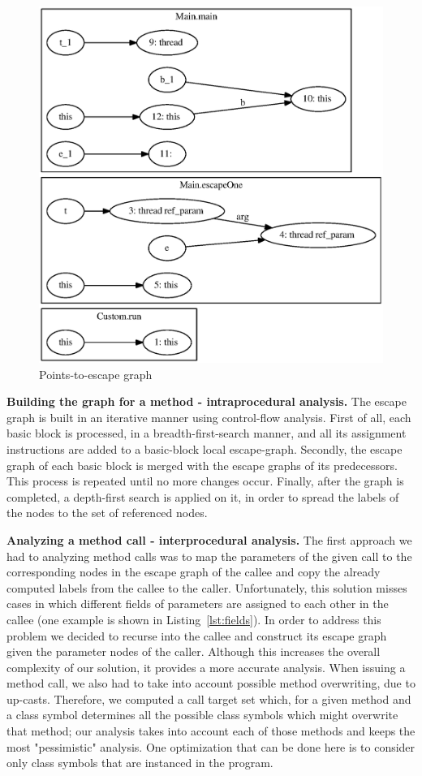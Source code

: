 \documentclass[letterpaper]{article}
\newcommand{\mypar}[1]{{\bf #1.}}
\begin{document}
\begin{figure} \center
 \includegraphics[width=0.8\linewidth]{EscapeTest.eps}
  \caption{Points-to-escape graph}
  \label{fig:escapegraph}
\end{figure}

\mypar{Building the graph for a method - intraprocedural analysis} The escape graph is built in an iterative manner using control-flow analysis.
First of all, each basic block is processed, in a breadth-first-search manner, and all its assignment instructions are added to a
basic-block local escape-graph.
Secondly, the escape graph of each basic block is merged with the escape graphs of its predecessors. This process
is repeated until no more changes occur. Finally, after the graph is completed, a depth-first search is applied on it,
in order to spread the labels of the nodes to the set of referenced nodes.

\mypar{Analyzing a method call - interprocedural analysis} The first approach we had to analyzing method calls was to map the parameters of the given
call to the corresponding nodes in the escape graph of the callee and copy the already computed labels from the callee to the
caller. Unfortunately, this solution misses cases in which different fields of parameters are assigned to each other in the callee
(one example is shown in Listing~\ref{lst:fields}). In order to address this problem we decided to recurse into the callee and
construct its escape graph given the parameter nodes of the caller. Although this increases the overall complexity of our solution,
it provides a more accurate analysis. When issuing a method call, we also had to take into account possible method overwriting, due to up-casts. Therefore, we computed a call target set which, for a given method and a class symbol
determines all the possible class symbols which might overwrite that method; our analysis takes into account
each of those methods and keeps the most "pessimistic" analysis. One optimization that can be done here is to
consider only class symbols that are instanced in the program.
\end{document}
